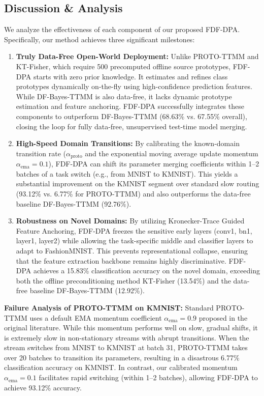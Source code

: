 \documentclass{article}
\theoremstyle{plain}
\theoremstyle{definition}
\theoremstyle{remark}
\begin{document}
\subsection{Discussion \& Analysis}
We analyze the effectiveness of each component of our proposed FDF-DPA. Specifically, our method achieves three significant milestones:
\begin{enumerate}
    \item \textbf{Truly Data-Free Open-World Deployment:} Unlike PROTO-TTMM and KT-Fisher, which require 500 precomputed offline source prototypes, FDF-DPA starts with zero prior knowledge. It estimates and refines class prototypes dynamically on-the-fly using high-confidence prediction features. While DF-Bayes-TTMM is also data-free, it lacks dynamic prototype estimation and feature anchoring. FDF-DPA successfully integrates these components to outperform DF-Bayes-TTMM (68.63\% vs. 67.55\% overall), closing the loop for fully data-free, unsupervised test-time model merging.
    \item \textbf{High-Speed Domain Transitions:} By calibrating the known-domain transition rate ($\alpha_{\text{proto}}$ and the exponential moving average update momentum $\alpha_{\text{ema}} = 0.1$), FDF-DPA can shift its parameter merging coefficients within 1--2 batches of a task switch (e.g., from MNIST to KMNIST). This yields a substantial improvement on the KMNIST segment over standard slow routing (93.12\% vs. 6.77\% for PROTO-TTMM) and also outperforms the data-free baseline DF-Bayes-TTMM (92.76\%).
    \item \textbf{Robustness on Novel Domains:} By utilizing Kronecker-Trace Guided Feature Anchoring, FDF-DPA freezes the sensitive early layers (conv1, bn1, layer1, layer2) while allowing the task-specific middle and classifier layers to adapt to FashionMNIST. This prevents representational collapse, ensuring that the feature extraction backbone remains highly discriminative. FDF-DPA achieves a 15.83\% classification accuracy on the novel domain, exceeding both the offline preconditioning method KT-Fisher (13.54\%) and the data-free baseline DF-Bayes-TTMM (12.92\%).
\end{enumerate}

\textbf{Failure Analysis of PROTO-TTMM on KMNIST:} Standard PROTO-TTMM uses a default EMA momentum coefficient $\alpha_{\text{ema}} = 0.9$ proposed in the original literature. While this momentum performs well on slow, gradual shifts, it is extremely slow in non-stationary streams with abrupt transitions. When the stream switches from MNIST to KMNIST at batch 31, PROTO-TTMM takes over 20 batches to transition its parameters, resulting in a disastrous 6.77\% classification accuracy on KMNIST. In contrast, our calibrated momentum $\alpha_{\text{ema}} = 0.1$ facilitates rapid switching (within 1--2 batches), allowing FDF-DPA to achieve 93.12\% accuracy.
\end{document}
